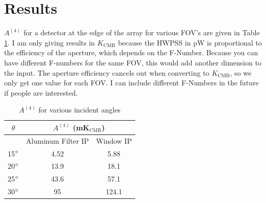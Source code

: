 \documentclass{article}
\theoremstyle{remark}
\newcommand{\A}[1]{A^{(#1)}}
\begin{document}
\section{Results}
$\A4$ for a detector at the edge of the array for various FOV's are given in Table \ref{table:HWPSS}.
I am only giving results in $K_\text{CMB}$ because the HWPSS in pW is proportional to the efficiency of the aperture,
which depends on the F-Number.
Because you can have different F-numbers for the same FOV, this would add another dimension to the input.
The aperture efficiency cancels out when converting to $K_\text{CMB}$, so we only get one value for each FOV.
I can include different F-Numbers in the future if people are interested.

\begin{table}[h]
\centering

\begin{tabular}{|c|c|c|}
\hline
$\theta$ & \multicolumn{2}{|c|}{$\A4 $ (mK$_\text{CMB}$)} \\
\hline
      & Aluminum Filter IP   & Window IP            \\
\hline
15$\degree$  & 4.52  & 5.88 \\
20$\degree$  & 13.9 & 18.1  \\
25$\degree$  & 43.6 & 57.1   \\
30$\degree$  & 95 & 124.1 \\\hline
\end{tabular}
\caption{ $\A4$ for various incident angles
}
\label{table:HWPSS}
\end{table}
\end{document}
